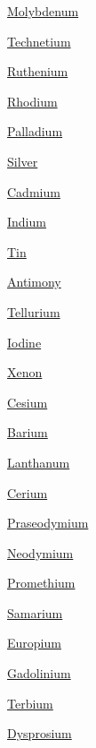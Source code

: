 \begin{DoxyCompactItemize}
\mbox{\hyperlink{group___isotope_const-_molybdenum}{Molybdenum}}
\item 
\mbox{\hyperlink{group___isotope_const-_technetium}{Technetium}}
\item 
\mbox{\hyperlink{group___isotope_const-_ruthenium}{Ruthenium}}
\item 
\mbox{\hyperlink{group___isotope_const-_rhodium}{Rhodium}}
\item 
\mbox{\hyperlink{group___isotope_const-_palladium}{Palladium}}
\item 
\mbox{\hyperlink{group___isotope_const-_silver}{Silver}}
\item 
\mbox{\hyperlink{group___isotope_const-_cadmium}{Cadmium}}
\item 
\mbox{\hyperlink{group___isotope_const-_indium}{Indium}}
\item 
\mbox{\hyperlink{group___isotope_const-_tin}{Tin}}
\item 
\mbox{\hyperlink{group___isotope_const-_antimony}{Antimony}}
\item 
\mbox{\hyperlink{group___isotope_const-_tellurium}{Tellurium}}
\item 
\mbox{\hyperlink{group___isotope_const-_iodine}{Iodine}}
\item 
\mbox{\hyperlink{group___isotope_const-_xenon}{Xenon}}
\item 
\mbox{\hyperlink{group___isotope_const-_cesium}{Cesium}}
\item 
\mbox{\hyperlink{group___isotope_const-_barium}{Barium}}
\item 
\mbox{\hyperlink{group___isotope_const-_lanthanum}{Lanthanum}}
\item 
\mbox{\hyperlink{group___isotope_const-_cerium}{Cerium}}
\item 
\mbox{\hyperlink{group___isotope_const-_praseodymium}{Praseodymium}}
\item 
\mbox{\hyperlink{group___isotope_const-_neodymium}{Neodymium}}
\item 
\mbox{\hyperlink{group___isotope_const-_promethium}{Promethium}}
\item 
\mbox{\hyperlink{group___isotope_const-_samarium}{Samarium}}
\item 
\mbox{\hyperlink{group___isotope_const-_europium}{Europium}}
\item 
\mbox{\hyperlink{group___isotope_const-_gadolinium}{Gadolinium}}
\item 
\mbox{\hyperlink{group___isotope_const-_terbium}{Terbium}}
\item 
\mbox{\hyperlink{group___isotope_const-_dysprosium}{Dysprosium}}

\end{DoxyCompactItemize}
